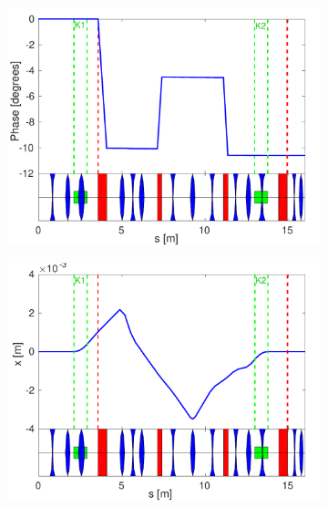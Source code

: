\documentclass[%
 reprint,
 superscriptaddress,
 amsmath,
 amssymb,
 prstab,
]{revtex4-1}
\begin{document}
\begin{figure}
	\begin{subfigure}{\columnwidth}
		\includegraphics[width=\textwidth]{figs/optics/pffOpticsPhase_chicane}
		\caption{}
		\label{f:pffOpticsPhase_chicane}
	\end{subfigure}
	\begin{subfigure}{\columnwidth}
		\includegraphics[width=\textwidth]{figs/optics/pffOpticsX_chicane}
		\caption{}
		\label{f:pffOpticsX_chicane}
	\end{subfigure}


\end{figure}
\end{document}
